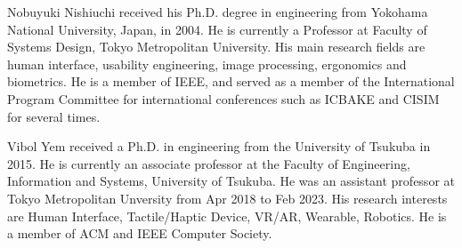 \documentclass{ieeeaccess}
\begin{document}
\begin{IEEEbiography}{Nobuyuki Nishiuchi} received his Ph.D. degree in engineering from Yokohama National University, Japan, in 2004. He is currently a Professor at Faculty of Systems Design, Tokyo Metropolitan University. His main research fields are human interface, usability engineering, image processing, ergonomics and biometrics. He is a member of IEEE, and served as a member of the International Program Committee for international conferences such as ICBAKE and CISIM for several times.
\end{IEEEbiography}


\begin{IEEEbiography}{Vibol Yem} received a Ph.D. in engineering from the University of Tsukuba in 2015. He is currently an associate professor at the  Faculty of  Engineering, Information and Systems, University of Tsukuba. He was an assistant professor at Tokyo Metropolitan Unversity from Apr 2018 to Feb 2023. His research interests are Human Interface, Tactile/Haptic Device, VR/AR, Wearable, Robotics. He is a member of ACM and IEEE Computer Society.
\end{IEEEbiography}

\EOD
\end{document}
